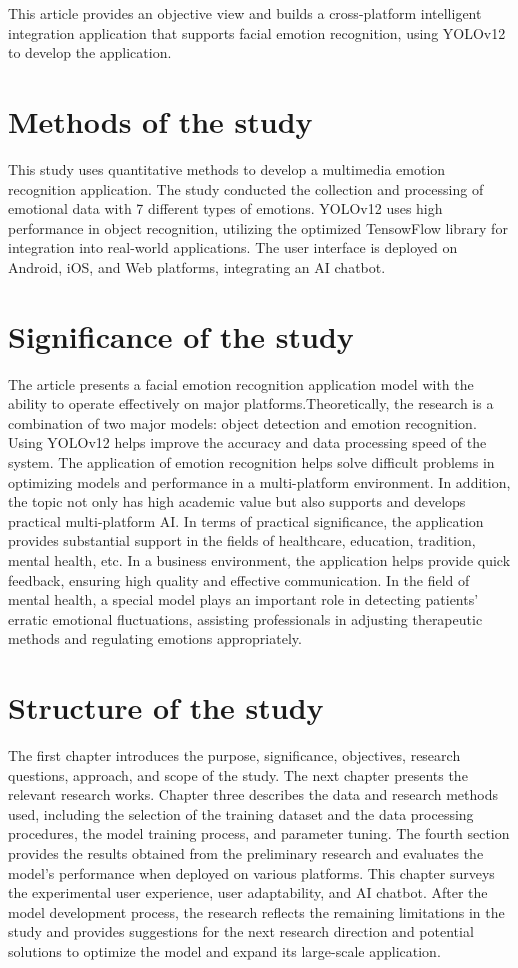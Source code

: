 \documentclass[a4paper,13pt]{report}
\begin{document}
This article provides an objective view and builds a cross-platform intelligent integration application that supports facial emotion recognition, using YOLOv12 to develop the application.

\section{Methods of the study }
This study uses quantitative methods to develop a multimedia emotion recognition application. The study conducted the collection and processing of emotional data with 7 different types of emotions. YOLOv12 uses high performance in object recognition, utilizing the optimized TensowFlow library for integration into real-world applications. The user interface is deployed on Android, iOS, and Web platforms, integrating an AI chatbot.

\section{Significance of the study}
The article presents a facial emotion recognition application model with the ability to operate effectively on major platforms.Theoretically, the research is a combination of two major models: object detection and emotion recognition. Using YOLOv12 helps improve the accuracy and data processing speed of the system. The application of emotion recognition helps solve difficult problems in optimizing models and performance in a multi-platform environment. In addition, the topic not only has high academic value but also supports and develops practical multi-platform AI.
In terms of practical significance, the application provides substantial support in the fields of healthcare, education, tradition, mental health, etc. In a business environment, the application helps provide quick feedback, ensuring high quality and effective communication. In the field of mental health, a special model plays an important role in detecting patients' erratic emotional fluctuations, assisting professionals in adjusting therapeutic methods and regulating emotions appropriately.

\section{Structure of the study}
The first chapter introduces the purpose, significance, objectives, research questions, approach, and scope of the study. The next chapter presents the relevant research works.
Chapter three describes the data and research methods used, including the selection of the training dataset and the data processing procedures, the model training process, and parameter tuning. The fourth section provides the results obtained from the preliminary research and evaluates the model's performance when deployed on various platforms. This chapter surveys the experimental user experience, user adaptability, and AI chatbot.
After the model development process, the research reflects the remaining limitations in the study and provides suggestions for the next research direction and potential solutions to optimize the model and expand its large-scale application.
\end{document}

